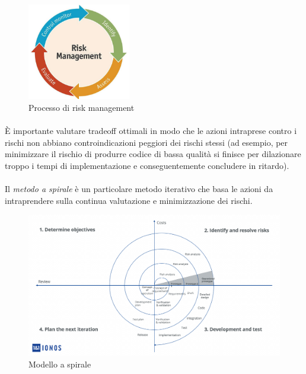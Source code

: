 \documentclass[12pt,a4paper,twoside,english,italian]{book}
\begin{document}
\begin{figure}[H]
    \centering
    \includegraphics[width=0.4\textwidth]{img/risk_management.jpg}
    \caption{Processo di risk management}
\end{figure}

\paragraph{} È importante valutare tradeoff ottimali in modo che le azioni intraprese contro i rischi non abbiano controindicazioni peggiori dei rischi stessi (ad esempio, per minimizzare il rischio di produrre codice di bassa qualità si finisce per dilazionare troppo i tempi di implementazione e conseguentemente concludere in ritardo). 

\paragraph{} Il \emph{metodo a spirale} \cite{modelli_sviluppo} è un particolare metodo iterativo che basa le azioni da intraprendere sulla continua valutazione e minimizzazione dei rischi. 

\begin{figure}[H]
    \centering
    \includegraphics[width=1\textwidth]{img/modello_spirale.png}
    \caption{Modello a spirale}
\end{figure}
\end{document}

